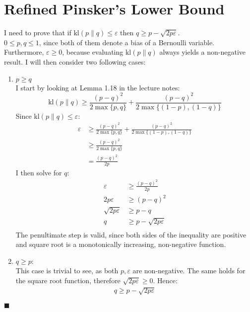 \documentclass[a4paper]{article}
\newcommand*{\QEDA}{\hfill\ensuremath{\blacksquare}}%
\begin{document}
\section{Refined Pinsker’s Lower Bound}
I need to prove that if $\mathrm{kl}(p \| q) \leq \varepsilon$ then
$q \geq p-\sqrt{2 p \varepsilon}$. \\
$0 \leq p,q \leq 1$, since both of them denote a bias of a Bernoulli variable.
Furthermore, $\varepsilon \geq 0$, because evaluating $\mathrm{kl}(p \| q)$ always yields
a non-negative result. I will then consider two following cases:
\begin{enumerate}
\item $p \geq q$\\
  I start by looking at Lemma 1.18 in the lecture notes:
  \[
  \mathrm{kl}(p \| q) \geq
  \frac{(p-q)^{2}}{2 \max \{p, q\}}+\frac{(p-q)^{2}}{2 \max \{(1-p),(1-q)\}}
  \]
  Since $\mathrm{kl}(p \| q) \leq \varepsilon$:
  \begin{align*}
    \varepsilon &\geq
    \frac{(p-q)^{2}}{2 \max \{p, q\}}+\frac{(p-q)^{2}}{2 \max \{(1-p),(1-q)\}}\\
    &\geq
    \frac{(p-q)^{2}}{2 \max \{p, q\}}
    \tag{since $\varepsilon,p,q \geq 0$}\\
    &=
    \frac{(p-q)^{2}}{2p}
      \tag{since $p \geq q$}
\end{align*}
  I then solve for $q$:
  \begin{align*}
    \varepsilon &\geq \frac{(p-q)^{2}}{2p} \\
    2p\varepsilon &\geq (p-q)^{2} \tag{since $p \geq 0$}\\
    \sqrt{2p\varepsilon} &\geq p-q \\
    q &\geq p-\sqrt{2 p \varepsilon} \tag{since $q \geq 0$}\\
  \end{align*}
    The penultimate step is valid, since both sides of the inequality are positive and
    square root is a monotonically increasing, non-negative function.
\item $q \geq p$:\\
  This case is trivial to see, as both $p, \varepsilon$ are non-negative.
  The same holds for the square root function, therefore
  $\sqrt{2 p \varepsilon} \geq 0$. Hence:
  \begin{align*}
    q \geq p-\sqrt{2 p \varepsilon} \tag{since $q \geq p$ in this case}
  \end{align*}
\end{enumerate}
\QEDA
\end{document}
